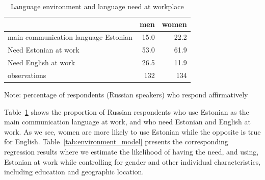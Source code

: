\documentclass[12pt, a4paper]{article}
\begin{document}
\begin{table}[t]
	\centering
	\caption{Language environment and language need at workplace}
	\label{tab:environment_descriptive}
	\begin{tabular}{lrr}
		\toprule
		                                     & men  & women \\
		\midrule
		main communication language Estonian & 15.0 & 22.2  \\
		Need Estonian at work                & 53.0 & 61.9  \\
		Need English  at work                & 26.5 & 11.9  \\
		\midrule
		observations                         & 132  & 134   \\
		\bottomrule
	\end{tabular}
	\begin{flushleft}
		Note: percentage of respondents (Russian speakers) who respond affirmatively
	\end{flushleft}
\end{table}

Table~\ref{tab:environment_descriptive} shows the proportion of
Russian respondents who use Estonian as the main communication language at work, and
who need Estonian and English at work.  As we see, women are more likely to
use Estonian while the opposite is true for English.
Table~\ref{tab:environment_model} presents the corresponding regression results
where we estimate the likelihood of having the need, and using, Estonian at work
while
controlling for gender and other individual
characteristics, including education and geographic location.
\end{document}

